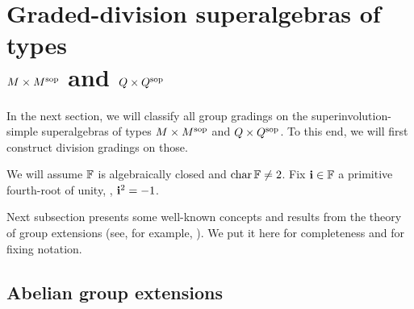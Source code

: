 \section[Graded-division superalgebras of types \texorpdfstring{$M \times M\sop$}{MxMsop} and \texorpdfstring{$Q \times Q\sop$}{QxQsop}]{Graded-division superalgebras of types \\ $M \times M\sop$ and $Q \times Q\sop$}\label{sec:model-O}

In the next section, we will classify all group gradings on the superinvolution-simple superalgebras of types $M \times M\sop$ and $Q \times Q\sop$. 
To this end, we will first construct division gradings on those. 

We will assume $\mathbb{F}$ is algebraically closed and $\operatorname{char} \mathbb{F} \neq 2$. 
Fix $\mathbf{i} \in \mathbb{F}$ a primitive fourth-root of unity, \ie, $\mathbf{i}^2 = -1$. 

Next subsection presents some well-known concepts and results from the theory of group extensions (see, for example, \cite{MR1344215}). 
We put it here for completeness and for fixing notation. 

\subsection{Abelian group extensions}

